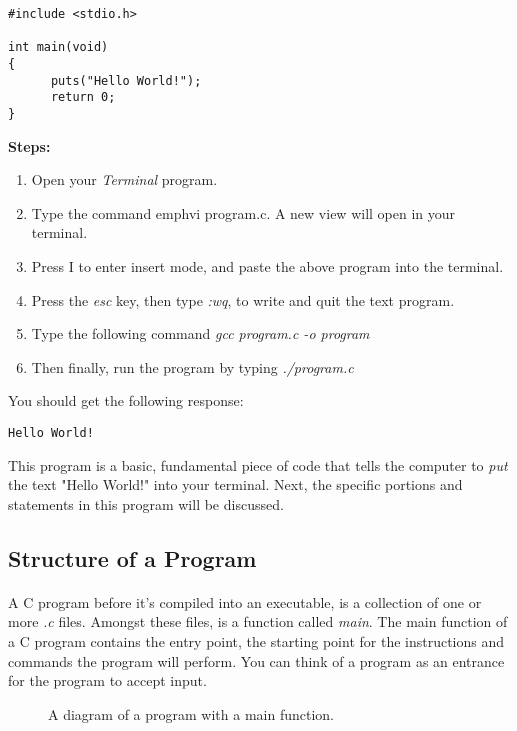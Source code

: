 \begin{lstlisting}[style = customc]
#include <stdio.h>

int main(void)
{
      puts("Hello World!");
      return 0;
}

\end{lstlisting}

\textbf{Steps:}
\begin{enumerate}
\item Open your \textit{Terminal} program.
\item Type the command emph{vi program.c}. A new view will open in your terminal.
\item Press I to enter insert mode, and paste the above program into the terminal.
\item Press the \textit{esc} key, then type \emph{:wq}, to write and quit the text program.
\item Type the following command \emph{gcc program.c -o program}
\item Then finally, run the program by typing \emph{./program.c}
\end{enumerate}

You should get the following response: \\


\begin{lstlisting}[style = customc]
Hello World!
\end{lstlisting}

This program is a basic, fundamental piece of code that tells the computer to \textit{put} the text "Hello World!" into your terminal. Next, the specific portions and statements in this program will be discussed.

\subsection{Structure of a Program}

\paragraph{   } A C program before it's compiled into an executable, is a collection of one or more \emph{.c} files. Amongst these files, is a function called \textit{main}. The main function of a C program contains the entry point, the starting point for the instructions and commands the program will perform. You can think of a program as an entrance for the program to accept input. 

\begin{figure}[h]
\begin{center}
\end{center}
\caption{ A diagram of a program with a main function.}
\end{figure}